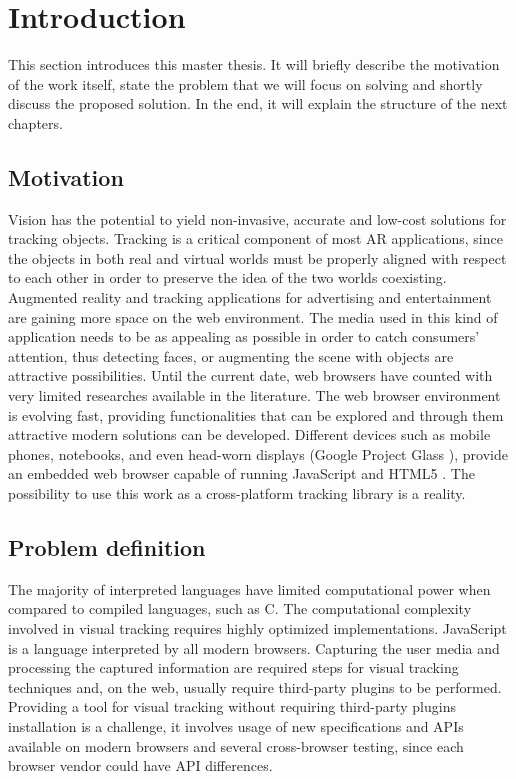 \chapter{Introduction} %
\label{cha:introduction}

This section introduces this master thesis. It will briefly describe the motivation of the work itself, state the problem that we will focus on solving and shortly discuss the proposed solution. In the end, it will explain the structure of the next chapters.

\section{Motivation} %
\label{sec:introduction:motivation}

Vision has the potential to yield non-invasive, accurate and low-cost solutions for tracking objects. Tracking is a critical component of most AR applications, since the objects in both real and virtual worlds must be properly aligned with respect to each other in order to preserve the idea of the two worlds coexisting. Augmented reality and tracking applications for advertising and entertainment are gaining more space on the web environment. The media used in this kind of application needs to be as appealing as possible in order to catch consumers' attention, thus detecting faces, or augmenting the scene with objects are attractive possibilities. Until the current date, web browsers have counted with very limited researches available in the literature. The web browser environment is evolving fast, providing functionalities that can be explored and through them attractive modern solutions can be developed. Different devices such as mobile phones, notebooks, and even head-worn displays \cite{Benford1998} (Google Project Glass \cite{Glass2013}), provide an embedded web browser capable of running JavaScript and HTML5 \cite{International2009,Hickson2013}. The possibility to use this work as a cross-platform tracking library is a reality.


\section{Problem definition} %
\label{sec:introduction:problem_definition}

The majority of interpreted languages have limited computational power when compared to compiled languages, such as C. The computational complexity involved in visual tracking requires highly optimized implementations. JavaScript \cite{International2009}  is a language interpreted by all modern browsers. Capturing the user media and processing the captured information are required steps for visual tracking techniques and, on the web, usually require third-party plugins to be performed. Providing a tool for visual tracking without requiring third-party plugins installation is a challenge, it involves usage of new specifications and APIs available on modern browsers and several cross-browser testing, since each browser vendor could have API differences.

